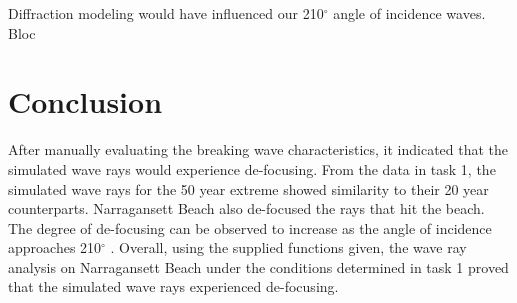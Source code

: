 Diffraction modeling would have influenced our 210$^{\circ}$ angle of incidence waves. Bloc

\section{Conclusion}
After manually evaluating the breaking wave characteristics, it indicated that the simulated wave rays would experience de-focusing. From the data in task 1, the simulated wave rays for the 50 year extreme showed similarity to their 20 year counterparts. Narragansett Beach also de-focused the rays that hit the beach. The degree of de-focusing can be observed to increase as the angle of incidence approaches 210$^{\circ}$ . Overall, using the supplied functions given, the wave ray analysis on Narragansett Beach under the conditions determined in task 1 proved that the simulated wave rays experienced de-focusing. 




